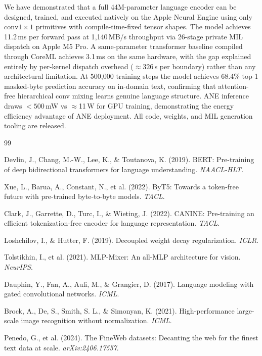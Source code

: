 \documentclass[10pt,twocolumn]{article}
\begin{document}
We have demonstrated that a full 44M-parameter language encoder can be
designed, trained, and executed natively on the Apple Neural Engine using
only $\text{conv}1{\times}1$ primitives with compile-time-fixed tensor shapes.
The model achieves 11.2\,ms per forward pass at 1{,}140\,MB/s throughput
via 26-stage private MIL dispatch on Apple M5 Pro.
A same-parameter transformer baseline compiled through CoreML achieves
3.1\,ms on the same hardware, with the gap explained entirely by
per-kernel dispatch overhead (${\approx}326$\,\textmu s per boundary)
rather than any architectural limitation.
At 500{,}000 training steps the model achieves 68.4\% top-1 masked-byte
prediction accuracy on in-domain text, confirming that attention-free
hierarchical conv mixing learns genuine language structure.
ANE inference draws $<500$\,mW vs $\approx$11\,W for GPU training,
demonstrating the energy efficiency advantage of ANE deployment.
All code, weights, and MIL generation tooling are released.




\begin{thebibliography}{99}

Devlin, J., Chang, M.-W., Lee, K., \& Toutanova, K. (2019).
BERT: Pre-training of deep bidirectional transformers for language understanding.
\emph{NAACL-HLT}.

Xue, L., Barua, A., Constant, N., et al. (2022).
ByT5: Towards a token-free future with pre-trained byte-to-byte models.
\emph{TACL}.

Clark, J., Garrette, D., Turc, I., \& Wieting, J. (2022).
CANINE: Pre-training an efficient tokenization-free encoder for language representation.
\emph{TACL}.

Loshchilov, I., \& Hutter, F. (2019).
Decoupled weight decay regularization.
\emph{ICLR}.

Tolstikhin, I., et al. (2021).
MLP-Mixer: An all-MLP architecture for vision.
\emph{NeurIPS}.

Dauphin, Y., Fan, A., Auli, M., \& Grangier, D. (2017).
Language modeling with gated convolutional networks.
\emph{ICML}.

Brock, A., De, S., Smith, S. L., \& Simonyan, K. (2021).
High-performance large-scale image recognition without normalization.
\emph{ICML}.

Penedo, G., et al. (2024).
The FineWeb datasets: Decanting the web for the finest text data at scale.
\emph{arXiv:2406.17557}.

\end{thebibliography}
\end{document}
